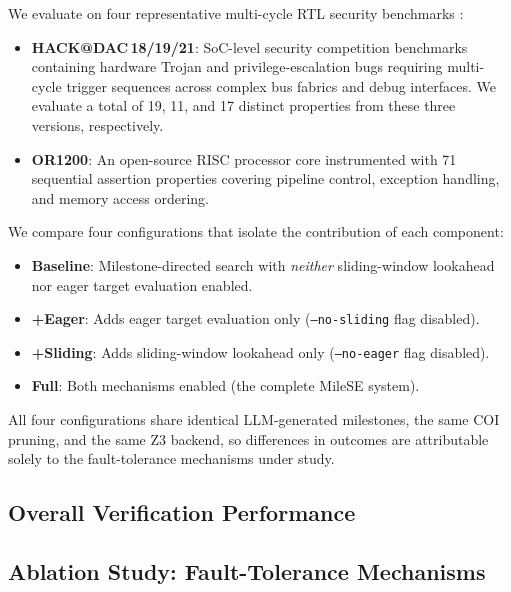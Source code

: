 \documentclass[conference]{IEEEtran}
\begin{document}
We evaluate on four representative multi-cycle RTL security benchmarks \cite{rogers2024securityproperties}:
\begin{itemize}
    \item \textbf{HACK@DAC\,18/19/21}: SoC-level security competition benchmarks containing hardware Trojan and privilege-escalation bugs requiring multi-cycle trigger sequences across complex bus fabrics and debug interfaces. We evaluate a total of 19, 11, and 17 distinct properties from these three versions, respectively.
    \item \textbf{OR1200}: An open-source RISC processor core instrumented with 71 sequential assertion properties covering pipeline control, exception handling, and memory access ordering.
\end{itemize}

We compare four configurations that isolate the contribution of each component:
\begin{itemize}
    \item \textbf{Baseline}: Milestone-directed search with \emph{neither} sliding-window lookahead nor eager target evaluation enabled.
    \item \textbf{+Eager}: Adds eager target evaluation only (\texttt{--no-sliding} flag disabled).
    \item \textbf{+Sliding}: Adds sliding-window lookahead only (\texttt{--no-eager} flag disabled).
    \item \textbf{Full}: Both mechanisms enabled (the complete MileSE system).
\end{itemize}

All four configurations share identical LLM-generated milestones, the same COI pruning, and the same Z3 backend, so differences in outcomes are attributable solely to the fault-tolerance mechanisms under study.

\subsection{Overall Verification Performance}
\label{subsec:eval_overall}



\subsection{Ablation Study: Fault-Tolerance Mechanisms}
\label{subsec:eval_ablation}
\end{document}
